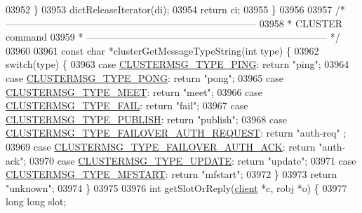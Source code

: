 \begin{DoxyCode}
{{{{{{{{{{{{{{{{{{{{{{{{{{{{{{{{{{{{{{{{{{{{{{{{{{{{{{{{{{{{{{{{{{{{{{{03952     \}
03953     dictReleaseIterator(di);
03954     \textcolor{keywordflow}{return} ci;
03955 \}
03956 
03957 \textcolor{comment}{/* -----------------------------------------------------------------------------}
03958 \textcolor{comment}{ * CLUSTER command}
03959 \textcolor{comment}{ * -------------------------------------------------------------------------- */}
03960 
03961 \textcolor{keyword}{const} \textcolor{keywordtype}{char} *clusterGetMessageTypeString(\textcolor{keywordtype}{int} type) \{
03962     \textcolor{keywordflow}{switch}(type) \{
03963     \textcolor{keywordflow}{case} \hyperlink{cluster_8h_aeb8a936505e22f64e5039523a3c96d4c}{CLUSTERMSG\_TYPE\_PING}: \textcolor{keywordflow}{return} \textcolor{stringliteral}{"ping"};
03964     \textcolor{keywordflow}{case} \hyperlink{cluster_8h_a33e9439f462f28177a31dfc74de0c16b}{CLUSTERMSG\_TYPE\_PONG}: \textcolor{keywordflow}{return} \textcolor{stringliteral}{"pong"};
03965     \textcolor{keywordflow}{case} \hyperlink{cluster_8h_aaf264f57ae1869c57093fd9fbc6fc5bc}{CLUSTERMSG\_TYPE\_MEET}: \textcolor{keywordflow}{return} \textcolor{stringliteral}{"meet"};
03966     \textcolor{keywordflow}{case} \hyperlink{cluster_8h_af5d51e3ad9965074b2124aabe1895d59}{CLUSTERMSG\_TYPE\_FAIL}: \textcolor{keywordflow}{return} \textcolor{stringliteral}{"fail"};
03967     \textcolor{keywordflow}{case} \hyperlink{cluster_8h_a874fecfd3ff886c2c697f5649ebee5ee}{CLUSTERMSG\_TYPE\_PUBLISH}: \textcolor{keywordflow}{return} \textcolor{stringliteral}{"publish"};
03968     \textcolor{keywordflow}{case} \hyperlink{cluster_8h_a739009308ed4cb5b19630a5f872408d2}{CLUSTERMSG\_TYPE\_FAILOVER\_AUTH\_REQUEST}: \textcolor{keywordflow}{return} \textcolor{stringliteral}{"auth-req"}
      ;
03969     \textcolor{keywordflow}{case} \hyperlink{cluster_8h_ae0db3a998d7da521c5359bdd8708f5f6}{CLUSTERMSG\_TYPE\_FAILOVER\_AUTH\_ACK}: \textcolor{keywordflow}{return} \textcolor{stringliteral}{"auth-ack"};
03970     \textcolor{keywordflow}{case} \hyperlink{cluster_8h_a51dc58bb78128fcae1751d654130ec0f}{CLUSTERMSG\_TYPE\_UPDATE}: \textcolor{keywordflow}{return} \textcolor{stringliteral}{"update"};
03971     \textcolor{keywordflow}{case} \hyperlink{cluster_8h_aa875273b4b11ae73d3cd3a8aea4ddcba}{CLUSTERMSG\_TYPE\_MFSTART}: \textcolor{keywordflow}{return} \textcolor{stringliteral}{"mfstart"};
03972     \}
03973     \textcolor{keywordflow}{return} \textcolor{stringliteral}{"unknown"};
03974 \}
03975 
03976 \textcolor{keywordtype}{int} getSlotOrReply(\hyperlink{structclient}{client} *c, robj *o) \{
03977     \textcolor{keywordtype}{long} \textcolor{keywordtype}{long} slot;
}}}}}}}}}}}}}}}}}}}}}}}}}}}}}}}}}}}}}}}}}}}}}}}}}}}}}}}}}}}}}}}}}}}}}}}
\end{DoxyCode}
